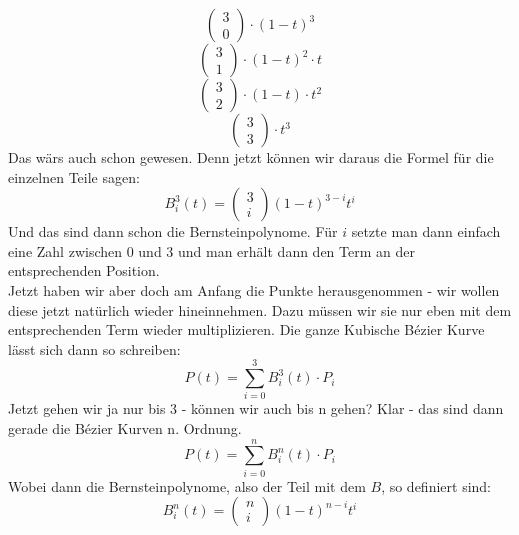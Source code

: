 \begin{displaymath}
\begin{pmatrix}
3 \\ 0
\end{pmatrix}\cdot (1-t)^3
\end{displaymath}
\begin{displaymath}
\begin{pmatrix}
3 \\ 1
\end{pmatrix}\cdot (1-t)^2\cdot t
\end{displaymath}
\begin{displaymath}
\begin{pmatrix}
3 \\ 2
\end{pmatrix}\cdot (1-t)\cdot t^2
\end{displaymath}
\begin{displaymath}
\begin{pmatrix}
3 \\ 3
\end{pmatrix}\cdot t^3
\end{displaymath}
Das wärs auch schon gewesen. Denn jetzt können wir daraus die Formel für die einzelnen Teile sagen:
\begin{displaymath}
B^3_i(t)=\begin{pmatrix}3 \\ i\end{pmatrix}(1-t)^{3-i}t^i
\end{displaymath}
Und das sind dann schon die Bernsteinpolynome.
Für \(i\) setzte man dann einfach eine Zahl zwischen 0 und 3 und man erhält dann den Term an der entsprechenden Position.\\ \newline
Jetzt haben wir aber doch am Anfang die Punkte herausgenommen - wir wollen diese jetzt natürlich wieder hineinnehmen. Dazu müssen wir sie nur eben mit dem entsprechenden Term wieder multiplizieren. Die ganze Kubische Bézier Kurve lässt sich dann so schreiben:
\begin{displaymath}
P(t) = \displaystyle\sum_{i=0}^{3} B^3_i(t)\cdot P_i
\end{displaymath}
Jetzt gehen wir ja nur bis 3 - können wir auch bis n gehen? Klar - das sind dann gerade die Bézier Kurven n. Ordnung.
\begin{displaymath}
P(t) = \displaystyle\sum_{i=0}^{n} B^n_i(t)\cdot P_i
\end{displaymath}
Wobei dann die Bernsteinpolynome, also der Teil mit dem \(B\), so definiert sind:
\begin{displaymath}
B^n_i(t)=\begin{pmatrix}n \\ i\end{pmatrix}(1-t)^{n-i}t^i
\end{displaymath}
